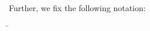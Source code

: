 
Further, we fix the following notation:
\begin{tabbing}
	\hspace*{3.6cm} \= \kill
	
%	
%	
	
	



\end{tabbing}
